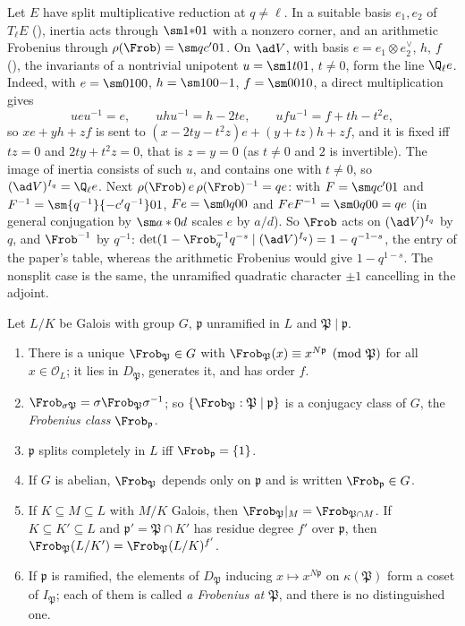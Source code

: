 \begin{example}\label{ex:ant:multiplicative}
Let $E$ have split multiplicative reduction at $q\ne\ell$. In a suitable basis $e_1,e_2$ of $T_\ell E$ (), inertia acts through
$\sm1{*}01$ with a nonzero corner, and an arithmetic Frobenius through $\rho(\Frob)=\sm q{c'}01$. On $\ad V$, with basis $e=e_1\otimes e_2^\vee$,
$h$, $f$ (), the invariants of a nontrivial unipotent $u=\sm1t01$, $t\ne0$, form the line $\Q_\ell e$. Indeed, with $e=\sm0100$,
$h=\sm100{-1}$, $f=\sm0010$, a direct multiplication gives
\[
ueu^{-1}=e,\qquad uhu^{-1}=h-2te,\qquad ufu^{-1}=f+th-t^2e,
\]
so $xe+yh+zf$ is sent to $(x-2ty-t^2z)e+(y+tz)h+zf$, and it is fixed iff $tz=0$ and $2ty+t^2z=0$, that is $z=y=0$ (as $t\ne0$ and $2$ is invertible). The
image of inertia consists of such $u$, and contains one with $t\ne0$, so $(\ad V)^{I_q}=\Q_\ell e$. Next $\rho(\Frob)\,e\,\rho(\Frob)^{-1}=qe$: with
$F=\sm q{c'}01$ and $F^{-1}=\sm{q^{-1}}{-c'q^{-1}}01$, $Fe=\sm0q00$ and $FeF^{-1}=\sm0q00=qe$ (in general conjugation by $\sm a*0d$ scales $e$ by $a/d$). So $\Frob$ acts on
$(\ad V)^{I_q}$ by $q$, and $\Frob^{-1}$ by $q^{-1}$: $\det(1-\Frob_q^{-1}q^{-s}\mid(\ad V)^{I_q})=1-q^{-1-s}$, the entry of the paper's table, whereas the
arithmetic Frobenius would give $1-q^{1-s}$. The nonsplit case is the same, the unramified quadratic character $\pm1$ cancelling in the adjoint.
\end{example}

\begin{proposition}\label{prop:ant:frobenius}
Let $L/K$ be Galois with group $G$, $\mathfrak p$ unramified in $L$ and $\mathfrak P\mid\mathfrak p$.
\begin{enumerate}[label=(\roman*)]
\item There is a unique $\Frob_{\mathfrak P}\in G$ with $\Frob_{\mathfrak P}(x)\equiv x^{N\mathfrak p}\pmod{\mathfrak P}$ for all $x\in\mathcal O_L$; it lies in
$D_{\mathfrak P}$, generates it, and has order $f$.
\item $\Frob_{\sigma\mathfrak P}=\sigma\Frob_{\mathfrak P}\sigma^{-1}$; so $\{\Frob_{\mathfrak P}:\mathfrak P\mid\mathfrak p\}$ is a conjugacy class of $G$, the
\emph{Frobenius class} $\Frob_{\mathfrak p}$.
\item $\mathfrak p$ splits completely in $L$ iff $\Frob_{\mathfrak p}=\{1\}$.
\item If $G$ is abelian, $\Frob_{\mathfrak P}$ depends only on $\mathfrak p$ and is written $\Frob_{\mathfrak p}\in G$.
\item If $K\subseteq M\subseteq L$ with $M/K$ Galois, then $\Frob_{\mathfrak P}|_M=\Frob_{\mathfrak P\cap M}$. If $K\subseteq K'\subseteq L$ and
$\mathfrak p'=\mathfrak P\cap K'$ has residue degree $f'$ over $\mathfrak p$, then $\Frob_{\mathfrak P}(L/K')=\Frob_{\mathfrak P}(L/K)^{f'}$.
\item If $\mathfrak p$ is ramified, the elements of $D_{\mathfrak P}$ inducing $x\mapsto x^{N\mathfrak p}$ on $\kappa(\mathfrak P)$ form a coset of
$I_{\mathfrak P}$; each of them is called \emph{a Frobenius at $\mathfrak P$}, and there is no distinguished one.
\end{enumerate}
\end{proposition}

